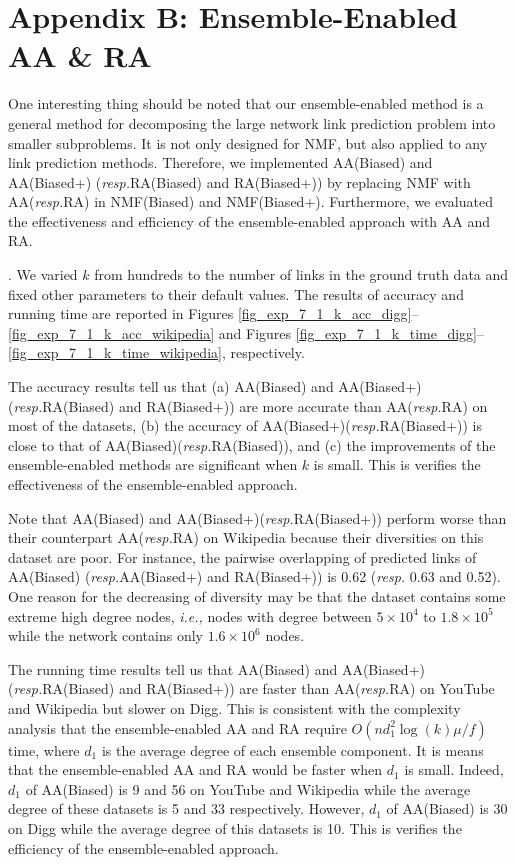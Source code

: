 \documentclass[10pt,journal,compsoc]{IEEEtran}
\newcommand{\stitle}[1]{\vspace{0.5ex}\noindent{\bf #1}}
\newcommand{\NMF}{{\sf NMF}\xspace }
\newcommand{\Biased}{{\sf NMF(Biased)}\xspace}
\newcommand{\Aa}{{\sf AA}\xspace }
\newcommand{\RA}{{\sf RA}\xspace }
\newcommand{\Digg}{{\sf Digg}\xspace}
\newcommand{\YouTube}{{\sf YouTube}\xspace}
\newcommand{\Wikipedia}{{\sf Wikipedia}\xspace}
\newcommand{\Biasedp}{{\sf NMF(Biased+)}\xspace}
\newcommand{\AABiased}{{\sf AA(Biased)}\xspace}
\newcommand{\AABiasedp}{{\sf AA(Biased+)}\xspace}
\newcommand{\RABiased}{{\sf RA(Biased)}\xspace}
\newcommand{\RABiasedp}{{\sf RA(Biased+)}\xspace}
\newcommand{\ie}{\emph{i.e.,}\xspace}
\newcommand{\resp}{\emph{resp.}\xspace}
\begin{document}
\section{Appendix B: Ensemble-Enabled AA \& RA}

One interesting thing should be noted that our ensemble-enabled
method is a general method for decomposing the large network
link prediction problem into smaller subproblems. It is not only
designed for \NMF, but also applied to any link prediction methods.
Therefore, we implemented \AABiased and \AABiasedp
(\resp \RABiased and \RABiasedp) by replacing \NMF with \Aa (\resp \RA) in
\Biased and \Biasedp. Furthermore, we evaluated the effectiveness and efficiency
of the ensemble-enabled approach with \Aa and \RA.


\stitle{Exp-7.1: Impacts of $k$}. We varied $k$ from hundreds to the number of links in the ground truth data
and fixed other parameters to their default values. The results of accuracy
and running time are reported in Figures \ref{fig_exp_7_1_k_acc_digg}--\ref{fig_exp_7_1_k_acc_wikipedia}
and Figures \ref{fig_exp_7_1_k_time_digg}--\ref{fig_exp_7_1_k_time_wikipedia}, respectively.


The accuracy results tell us that (a) \AABiased and \AABiasedp (\resp \RABiased and \RABiasedp)
are more accurate than \Aa (\resp \RA) on most of the datasets,
(b) the accuracy of \AABiasedp (\resp \RABiasedp) is close to that of \AABiased (\resp \RABiased),
and (c) the improvements of the ensemble-enabled methods are significant when $k$
is small. This is verifies the effectiveness of the ensemble-enabled approach.

Note that \AABiased and \AABiasedp (\resp \RABiasedp)
perform worse than their counterpart \Aa (\resp \RA) on \Wikipedia because their diversities
on this dataset are poor. For instance, the pairwise overlapping of predicted links of \AABiased
(\resp \AABiasedp and \RABiasedp) is 0.62 (\resp 0.63 and 0.52). One reason for the decreasing
of diversity may be that the dataset contains some extreme high degree nodes,
\ie nodes with degree between $5 \times 10^4$ to $1.8 \times 10^5$ while the network contains
only $1.6 \times 10^6$ nodes.

The running time results tell us that \AABiased and \AABiasedp (\resp \RABiased and \RABiasedp)
are faster than \Aa (\resp \RA) on \YouTube and \Wikipedia but
slower on \Digg. This is consistent with the complexity analysis
that the ensemble-enabled \Aa and \RA require $O(nd_{1}^{2}\log(k)\mu/f)$ time,
where $d_1$ is the average degree of each ensemble component. It is means
that the ensemble-enabled \Aa and \RA would be faster when $d_1$ is small.
Indeed, $d_1$ of \AABiased is 9 and 56 on \YouTube and \Wikipedia while the average
degree of these datasets is 5 and 33 respectively. However, $d_1$ of \AABiased is 30
on \Digg  while the average degree of this datasets is 10. This is verifies the
efficiency of the ensemble-enabled approach.
\end{document}
